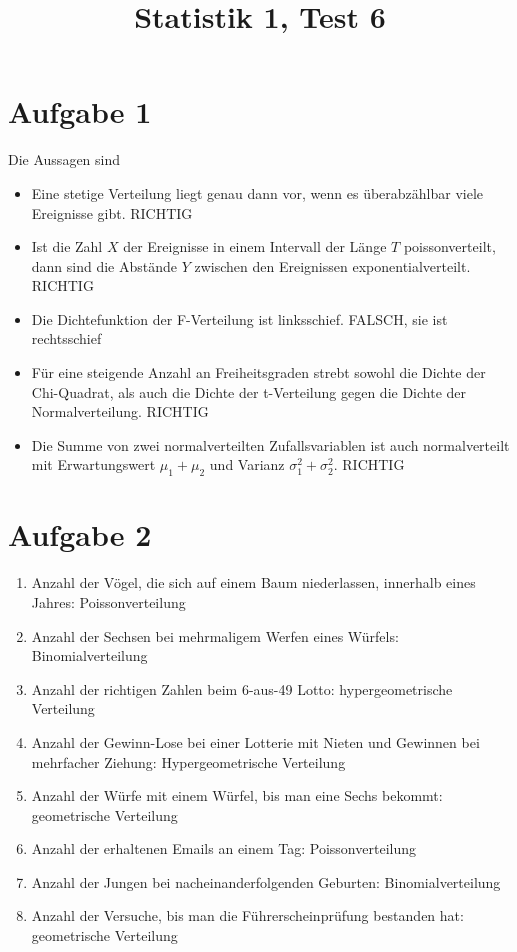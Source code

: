 \documentclass{article}
\title{\textbf{Statistik 1, Test 6}}
\date{}
\begin{document}
	\maketitle
	
	\section*{Aufgabe 1}
	Die Aussagen sind
	\begin{itemize}
		\item Eine stetige Verteilung liegt genau dann vor, wenn es überabzählbar viele Ereignisse gibt. RICHTIG
		\item Ist die Zahl $X$ der Ereignisse in einem Intervall der Länge $T$ poissonverteilt, dann sind die Abstände $Y$ zwischen den Ereignissen exponentialverteilt. RICHTIG
		\item Die Dichtefunktion der F-Verteilung ist linksschief. FALSCH, sie ist rechtsschief
		\item Für eine steigende Anzahl an Freiheitsgraden strebt sowohl die Dichte der Chi-Quadrat, als auch die Dichte der t-Verteilung gegen die Dichte der Normalverteilung. RICHTIG
		\item Die Summe von zwei normalverteilten Zufallsvariablen ist auch normalverteilt mit Erwartungswert $\mu_1 + \mu_2$ und Varianz $\sigma_1^2 + \sigma_2^2$. RICHTIG
	\end{itemize}

	\section*{Aufgabe 2}
	\begin{enumerate}[label=(\alph*)]
		\item Anzahl der Vögel, die sich auf einem Baum niederlassen, innerhalb eines Jahres: Poissonverteilung
		\item Anzahl der Sechsen bei mehrmaligem Werfen eines Würfels: Binomialverteilung
		\item Anzahl der richtigen Zahlen beim 6-aus-49 Lotto: hypergeometrische Verteilung
		\item Anzahl der Gewinn-Lose bei einer Lotterie mit Nieten und Gewinnen bei mehrfacher Ziehung: Hypergeometrische Verteilung
		\item Anzahl der Würfe mit einem Würfel, bis man eine Sechs bekommt: geometrische Verteilung
		\item Anzahl der erhaltenen Emails an einem Tag: Poissonverteilung
		\item Anzahl der Jungen bei nacheinanderfolgenden Geburten: Binomialverteilung
		\item Anzahl der Versuche, bis man die Führerscheinprüfung bestanden hat: geometrische Verteilung
	\end{enumerate}
\end{document}
